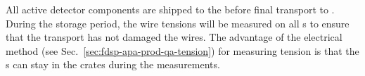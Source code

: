 All active detector components are shipped to the  before final transport to . During the storage period, the wire tensions will be measured on all s to ensure that the transport has not damaged the wires. The advantage of the electrical method (see Sec.~\ref{sec:fdsp-apa-prod-qa-tension}) for measuring tension is that the s can stay in the crates during the measurements. 


